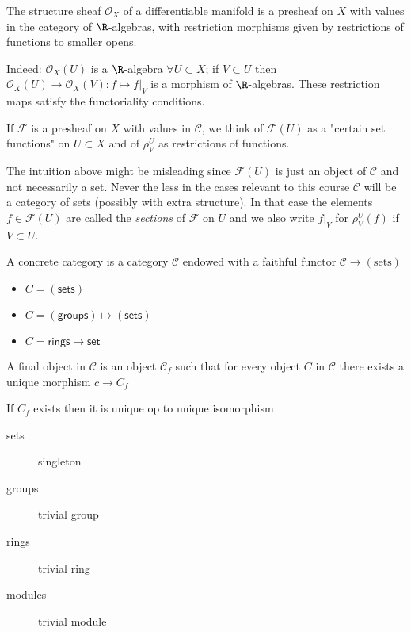 \begin{example}
	The structure sheaf $\mathcal{O} _X$ of a differentiable manifold is a presheaf on $X$ with values in the category of $\R$-algebras, with restriction morphisms given by restrictions of functions to smaller opens.

	Indeed: $\mathcal{O} _X(U)$ is a $\R$-algebra $\forall U \subset X$; if $V\subset U$ then $\mathcal{O} _X(U) \to \mathcal{O} _X(V): f \mapsto f|_V$ is a morphism of $\R$-algebras. These restriction maps satisfy the functoriality conditions.
\end{example}
\begin{intuition}
	If $\mathcal{F} $ is a presheaf on $X$ with values in $\mathcal{C} $, we think of $\mathcal{F} (U)$ as a "certain set functions" on $U \subset X$ and of $\rho_V^{U}$ as restrictions of functions.
\end{intuition}
\begin{remark}
	The intuition above might be misleading since $\mathcal{F} (U)$ is just an object of $\mathcal{ C} $ and not necessarily a set.
	Never the less in the cases relevant to this course $\mathcal{C} $ will be a category of sets (possibly with extra structure).
	In that case the elements $f \in \mathcal{F} (U)$ are called the \emph{sections} of $\mathcal{F} $ on $U$ and we also write $f|_V$ for $\rho^{U}_V (f)$ if $V\subset U$.
\end{remark}

\begin{definition}
	A concrete category is a category $\mathcal{C}$ endowed with a faithful functor $\mathcal{C}  \to (\text{sets})$
\end{definition}
\begin{example}
	\begin{itemize}
		\item $C = \left( \mathsf{sets} \right)  $
		\item $C = (\mathsf{groups}) \mapsto (\mathsf{sets})$
			\item $C = \mathsf{rings} \to \mathsf{set } $
	\end{itemize}
\end{example}
\begin{definition}
	A final object in $\mathcal{C} $ is an object $\mathcal{C} _f$ such that for every object $C$ in $\mathcal{C}$ there exists a unique morphism $c \to C_f$
\end{definition}
\begin{remark}
	If $C_f$ exists then it is unique op to unique isomorphism
\end{remark}
\begin{example}
	\begin{description}
		\item[sets] singleton
		\item[groups] trivial group
		\item[rings] trivial ring
		\item [modules] trivial module
	\end{description}
\end{example}

